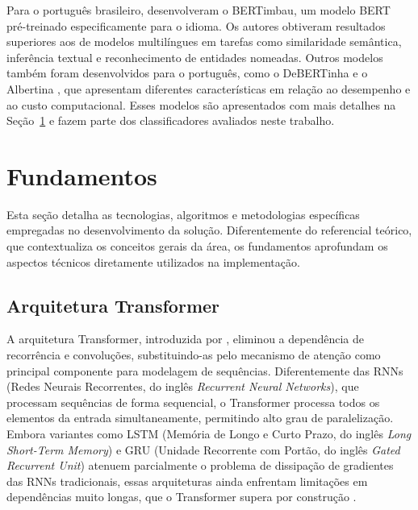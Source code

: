 \documentclass[
    12pt,                %
    openright,           %
    oneside,             %
    a4paper,             %
    english,             %
    brazil               %
]{abntex2}
\begin{document}
Para o português brasileiro,  desenvolveram o BERTimbau, um modelo BERT pré-treinado especificamente para o idioma. Os autores obtiveram resultados superiores aos de modelos multilíngues em tarefas como similaridade semântica, inferência textual e reconhecimento de entidades nomeadas. Outros modelos também foram desenvolvidos para o português, como o DeBERTinha \cite{Campiotti2023} e o Albertina \cite{Rodrigues2023, Santos2024}, que apresentam diferentes características em relação ao desempenho e ao custo computacional. Esses modelos são apresentados com mais detalhes na Seção~\ref{sec:fundamentos} e fazem parte dos classificadores avaliados neste trabalho.

\section{Fundamentos}
\label{sec:fundamentos}

Esta seção detalha as tecnologias, algoritmos e metodologias específicas empregadas no desenvolvimento da solução. Diferentemente do referencial teórico, que contextualiza os conceitos gerais da área, os fundamentos aprofundam os aspectos técnicos diretamente utilizados na implementação.


\subsection{Arquitetura Transformer}

A arquitetura Transformer, introduzida por , eliminou a dependência de recorrência e convoluções, substituindo-as pelo mecanismo de atenção como principal componente para modelagem de sequências. Diferentemente das RNNs (Redes Neurais Recorrentes, do inglês \textit{Recurrent Neural Networks}), que processam sequências de forma sequencial, o Transformer processa todos os elementos da entrada simultaneamente, permitindo alto grau de paralelização. Embora variantes como LSTM (Memória de Longo e Curto Prazo, do inglês \textit{Long Short-Term Memory}) e GRU (Unidade Recorrente com Portão, do inglês \textit{Gated Recurrent Unit}) atenuem parcialmente o problema de dissipação de gradientes das RNNs tradicionais, essas arquiteturas ainda enfrentam limitações em dependências muito longas, que o Transformer supera por construção \cite{Vaswani2017}.
\end{document}
